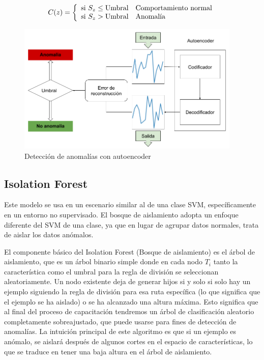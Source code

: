 \begin{equation}
C(z) = \left\lbrace
\begin{array}{ll}
\textup{si } S_{z}\leq \textup{Umbral} & \textup{Comportamiento normal}\\
\textup{si } S_{z}> \textup{Umbral} & \textup{Anomal\'{i}a}
\end{array}
\right.
\label{eqn:threshold}
\end{equation}

\begin{figure}[h!]
  \begin{center}	\includegraphics[width=0.95\textwidth]{imagenes/Cap4/autoencoder-anomaly}
  \caption{Detecci\'{o}n de anomal\'{i}as con autoencoder} 
  \label{fig:autoencoder-anomaly}
  \end{center}
\end{figure}

\subsection{Isolation Forest}

Este modelo se usa en un escenario similar al de una clase SVM, específicamente en un entorno no supervisado. El bosque de aislamiento adopta un enfoque diferente del SVM de una clase, ya que en lugar de agrupar datos normales, trata de aislar los datos anómalos.

\vspace{5mm} %

El componente básico del Isolation Forest (Bosque de aislamiento) es el árbol de aislamiento, que es un árbol binario simple donde en cada nodo $T_{i}$ tanto la característica como el umbral para la regla de división se seleccionan aleatoriamente. Un nodo existente deja de generar hijos si y solo si solo hay un ejemplo siguiendo la regla de división para esa ruta específica (lo que significa que el ejemplo se ha aislado) o se ha alcanzado una altura máxima. Esto significa que al final del proceso de capacitación tendremos un árbol de clasificación aleatorio completamente sobreajustado, que puede usarse para fines de detección de anomalías. La intuición principal de este algoritmo es que si un ejemplo es anómalo, se aislará después de algunos cortes en el espacio de características, lo que se traduce en tener una baja altura en el árbol de aislamiento.

